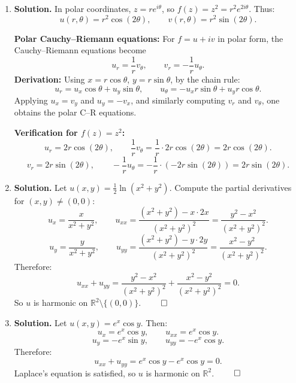 \begin{enumerate}
By the Cauchy--Riemann equations, $u_x = v_y$ and $u_y = -v_x$, so also $v_y = 0$ and $u_y = 0$ everywhere in $D$.

Since all partial derivatives of $u$ and $v$ vanish on the connected open set $D$, both $u$ and $v$ are constant on $D$ (by a standard result from real analysis: a function with zero gradient on a connected open set is constant). Therefore $f$ is constant. $\qed$

\item \textbf{Solution.}
In polar coordinates, $z = re^{i\theta}$, so $f(z) = z^2 = r^2 e^{2i\theta}$. Thus:
\[
u(r,\theta) = r^2 \cos(2\theta), \qquad v(r,\theta) = r^2 \sin(2\theta).
\]

\textbf{Polar Cauchy--Riemann equations:} For $f = u + iv$ in polar form, the Cauchy--Riemann equations become
\[
u_r = \frac{1}{r}v_\theta, \qquad v_r = -\frac{1}{r}u_\theta.
\]
\textbf{Derivation:} Using $x = r\cos\theta$, $y = r\sin\theta$, by the chain rule:
\[
u_r = u_x \cos\theta + u_y \sin\theta, \qquad u_\theta = -u_x r\sin\theta + u_y r\cos\theta.
\]
Applying $u_x = v_y$ and $u_y = -v_x$, and similarly computing $v_r$ and $v_\theta$, one obtains the polar C--R equations.

\textbf{Verification for $f(z) = z^2$:}
\[
u_r = 2r\cos(2\theta), \qquad \frac{1}{r}v_\theta = \frac{1}{r}\cdot 2r\cos(2\theta) = 2r\cos(2\theta).\]
\[
v_r = 2r\sin(2\theta), \qquad -\frac{1}{r}u_\theta = -\frac{1}{r}\cdot(-2r\sin(2\theta)) = 2r\sin(2\theta).\]

\item \textbf{Solution.}
Let $u(x,y) = \frac{1}{2}\ln(x^2 + y^2)$. Compute the partial derivatives for $(x,y) \neq (0,0)$:
\[
u_x = \frac{x}{x^2 + y^2}, \qquad u_{xx} = \frac{(x^2+y^2) - x \cdot 2x}{(x^2+y^2)^2} = \frac{y^2 - x^2}{(x^2+y^2)^2}.
\]
\[
u_y = \frac{y}{x^2 + y^2}, \qquad u_{yy} = \frac{(x^2+y^2) - y \cdot 2y}{(x^2+y^2)^2} = \frac{x^2 - y^2}{(x^2+y^2)^2}.
\]
Therefore:
\[
u_{xx} + u_{yy} = \frac{y^2 - x^2}{(x^2+y^2)^2} + \frac{x^2 - y^2}{(x^2+y^2)^2} = 0.
\]
So $u$ is harmonic on $\mathbb{R}^2 \setminus \{(0,0)\}$. $\qed$

\item \textbf{Solution.}
Let $u(x,y) = e^x \cos y$. Then:
\[
u_x = e^x \cos y, \qquad u_{xx} = e^x \cos y.
\]
\[
u_y = -e^x \sin y, \qquad u_{yy} = -e^x \cos y.
\]
Therefore:
\[
u_{xx} + u_{yy} = e^x \cos y - e^x \cos y = 0.
\]
Laplace's equation is satisfied, so $u$ is harmonic on $\mathbb{R}^2$. $\qed$


\end{enumerate}

